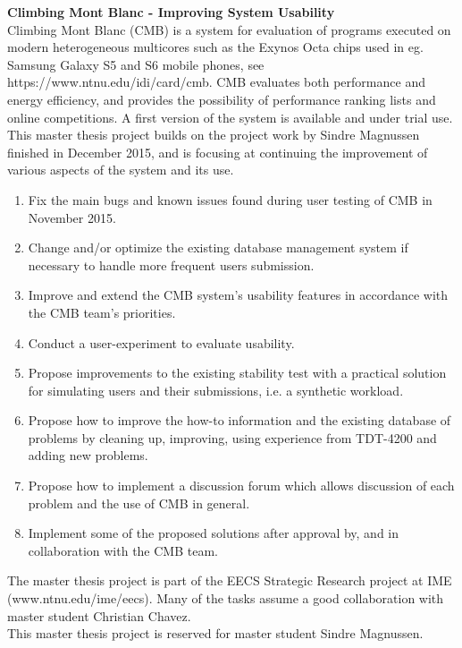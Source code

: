 \textbf{Climbing Mont Blanc - Improving System Usability} \\

Climbing Mont Blanc (CMB) is a system for evaluation of programs executed on modern heterogeneous multicores such as the Exynos Octa chips used in eg. Samsung Galaxy S5 and S6 mobile phones, see https://www.ntnu.edu/idi/card/cmb. CMB evaluates both performance and energy efficiency, and provides the possibility of performance ranking lists and online competitions. A first version of the system is available and under trial use. This master thesis project builds on the project work by Sindre Magnussen finished in December 2015, and is focusing  at continuing the improvement of various aspects of the system and its use. \\

\begin{enumerate}
\item Fix the main bugs and known issues found during user testing of CMB in November 2015.

\item Change and/or optimize the existing database management system if necessary to handle more frequent users submission.

\item Improve and extend the CMB system's usability features in accordance with the CMB team's priorities.

\item  Conduct a user-experiment to evaluate usability.

\item Propose improvements to the existing stability test with a practical solution for simulating users and their submissions, i.e. a synthetic workload.

\item Propose how to improve the how-to information and the existing database of problems by cleaning up, improving, using experience from TDT-4200 and adding new problems.

\item Propose how to implement a discussion forum which allows discussion of each problem and the use of CMB in general.

\item Implement some of the proposed solutions after approval by, and in collaboration with the CMB team.

\end{enumerate}

The master thesis project is part of the EECS Strategic Research project at IME (www.ntnu.edu/ime/eecs). Many of the tasks assume a good collaboration with master student Christian Chavez. \\

This master thesis project is reserved for master student Sindre Magnussen. \\
